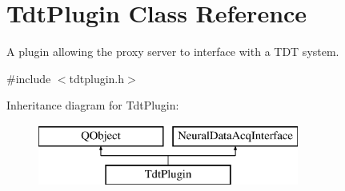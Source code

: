\hypertarget{class_tdt_plugin}{\section{Tdt\-Plugin Class Reference}
\label{class_tdt_plugin}
}


A plugin allowing the proxy server to interface with a T\-D\-T system.  




{\ttfamily \#include $<$tdtplugin.\-h$>$}

Inheritance diagram for Tdt\-Plugin\-:\begin{figure}[H]
\begin{center}
\leavevmode
\includegraphics[height=2.000000cm]{class_tdt_plugin}
\end{center}
\end{figure}
